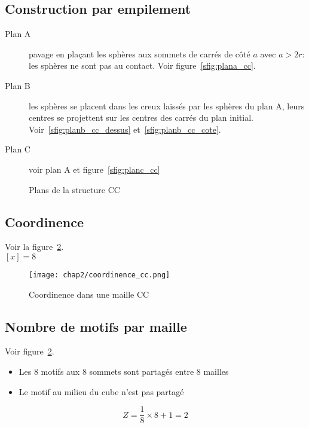 \subsection{Construction par empilement}
\begin{description}
    \item[Plan A] pavage en plaçant les sphères aux sommets de carrés
        de côté $a$ avec $a>2r$: les sphères ne sont pas au contact.
        Voir figure~\ref{sfig:plana_cc}.
    \item[Plan B] les sphères se placent dans les creux laissés par 
        les sphères du plan A, leurs centres se projettent sur
        les centres des carrés du plan initial.
        Voir~\ref{sfig:planb_cc_dessus} et~\ref{sfig:planb_cc_cote}.
    \item[Plan C] voir plan A et figure~\ref{sfig:planc_cc}
\end{description}
\begin{figure}
    \qquad
    \qquad
    \qquad
    \caption{Plans de la structure CC}\label{plans_cc}
\end{figure}

\subsection{Coordinence}
Voir la figure~\ref{fig:coordinence_cc}.\\
$[x] = 8$
\begin{figure}
    \centering
    \texttt{[image: chap2/coordinence\_cc.png]}
    \caption{Coordinence dans une maille CC}\label{fig:coordinence_cc}
\end{figure}

\subsection{Nombre de motifs par maille}
Voir figure~\ref{fig:coordinence_cc}.
\begin{itemize}
    \item Les 8 motifs aux 8 sommets sont partagés entre 8 mailles
    \item Le motif au milieu du cube n'est pas partagé
\end{itemize}
\begin{equation}
    Z = \frac{1}{8} \times 8 + 1 = 2
\end{equation}

